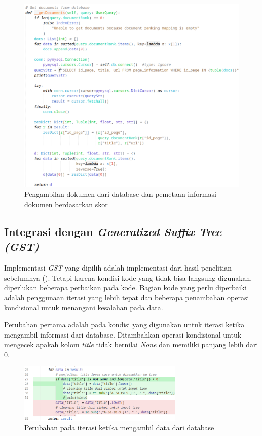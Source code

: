 \begin{figure}[H]
  \centering{}
	\includegraphics[width=\textwidth]{gambar/implementasi_getdocuments}
  \caption{Pengambilan dokumen dari database dan pemetaan informasi dokumen 
  berdasarkan skor}
\end{figure}

\subsection{Integrasi dengan \textit{Generalized Suffix Tree (GST)}}

Implementasi \textit{GST} yang dipilih adalah implementasi dari hasil penelitian
sebelumnya (\cite{zaidan2023gst}). Tetapi karena kondisi kode yang tidak bisa
langsung digunakan, diperlukan beberapa perbaikan pada kode. Bagian kode yang
perlu diperbaiki adalah penggunaan iterasi yang lebih tepat dan beberapa
penambahan operasi kondisional untuk menangani kesalahan pada data.

Perubahan pertama adalah pada kondisi yang digunakan untuk iterasi ketika 
mengambil informasi dari database. Ditambahkan operasi kondisional untuk 
mengecek apakah kolom \textit{title} tidak bernilai \textit{None} dan memiliki 
panjang lebih dari $0$.

\begin{figure}[H]
  \centering{}
	\includegraphics[width=0.7\textwidth]{gambar/implementasi_gstchange2}
  \caption{Perubahan pada iterasi ketika mengambil data dari database}
\end{figure}

